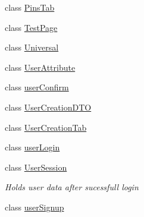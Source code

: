 \begin{DoxyCompactItemize}
class \hyperlink{class_pinned_app_1_1_pins_tab}{Pins\+Tab}
\item 
class \hyperlink{class_pinned_app_1_1_test_page}{Test\+Page}
\item 
class \hyperlink{class_pinned_app_1_1_universal}{Universal}
\item 
class \hyperlink{class_pinned_app_1_1_user_attribute}{User\+Attribute}
\item 
class \hyperlink{class_pinned_app_1_1user_confirm}{user\+Confirm}
\item 
class \hyperlink{class_pinned_app_1_1_user_creation_d_t_o}{User\+Creation\+D\+TO}
\item 
class \hyperlink{class_pinned_app_1_1_user_creation_tab}{User\+Creation\+Tab}
\item 
class \hyperlink{class_pinned_app_1_1user_login}{user\+Login}
\item 
class \hyperlink{class_pinned_app_1_1_user_session}{User\+Session}
\begin{DoxyCompactList}\small\item\em Holds user data after sucessfull login \end{DoxyCompactList}\item 
class \hyperlink{class_pinned_app_1_1user_signup}{user\+Signup}
\end{DoxyCompactItemize}
